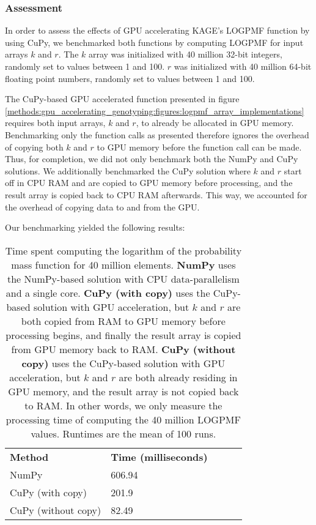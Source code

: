 \subsubsection{Assessment} \label{methods:gpu_accelerating_genotyping:cupy_logpmf_assessment}
In order to assess the effects of GPU accelerating KAGE's LOGPMF function by using CuPy, we benchmarked both functions by computing LOGPMF for input arrays $k$ and $r$.
The $k$ array was initialized with 40 million 32-bit integers, randomly set to values between 1 and 100.
$r$ was initialized with 40 million 64-bit floating point numbers, randomly set to values between 1 and 100.

The CuPy-based GPU accelerated function presented in figure \ref{methods:gpu_accelerating_genotyping:figures:logpmf_array_implementations} requires both input arrays, $k$ and $r$, to already be allocated in GPU memory.
Benchmarking only the function calls as presented therefore ignores the overhead of copying both $k$ and $r$ to GPU memory before the function call can be made.
Thus, for completion, we did not only benchmark both the NumPy and CuPy solutions. We additionally benchmarked the CuPy solution where $k$ and $r$ start off in CPU RAM and are copied to GPU memory before processing, and the result array is copied back to CPU RAM afterwards. 
This way, we accounted for the overhead of copying data to and from the GPU.

Our benchmarking yielded the following results:
\begin{table}[H]
\begin{center}
\begin{tabular}{lllll}
\multicolumn{1}{l|}{\textbf{Method}} & \multicolumn{1}{l}{\textbf{Time (milliseconds)}} &  \\ \cline{1-2}
\multicolumn{1}{l|}{NumPy} & \multicolumn{1}{l}{606.94} &  \\
\multicolumn{1}{l|}{CuPy (with copy)} & \multicolumn{1}{l}{201.9} & \\
\multicolumn{1}{l|}{CuPy (without copy)} & \multicolumn{1}{l}{82.49}
\end{tabular}
\end{center}
\caption{
  Time spent computing the logarithm of the probability mass function for 40 million elements.
  \textbf{NumPy} uses the NumPy-based solution with CPU data-parallelism and a single core.
  \textbf{CuPy (with copy)} uses the CuPy-based solution with GPU acceleration, but $k$ and $r$ are both copied from RAM to GPU memory before processing begins, and finally the result array is copied from GPU memory back to RAM.
  \textbf{CuPy (without copy)} uses the CuPy-based solution with GPU acceleration, but $k$ and $r$ are both already residing in GPU memory, and the result array is not copied back to RAM. In other words, we only measure the processing time of computing the 40 million LOGPMF values.
  Runtimes are the mean of 100 runs.
}
\label{methods:gpu_accelerating_genotyping:tables:logpmf_benchmark}
\end{table}


